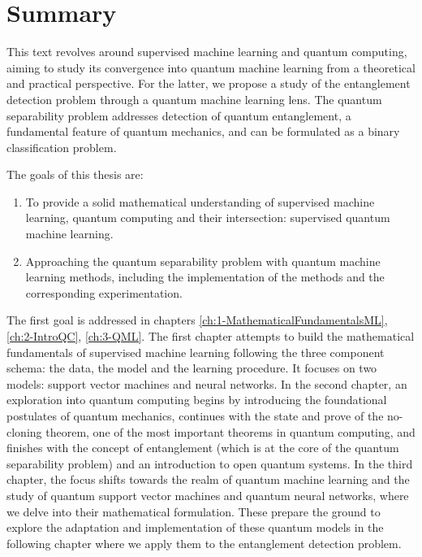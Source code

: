 %

\chapter{Summary}

This text revolves around supervised machine learning and quantum computing, aiming to study its convergence into quantum machine learning from a theoretical and practical perspective. For the latter, we propose a study of the entanglement detection problem through a quantum machine learning lens. The quantum separability problem addresses detection of quantum entanglement, a fundamental feature of quantum mechanics, and can be formulated as a binary classification problem.
\vspace{5pt}

The goals of this thesis are: 
\begin{enumerate}
	\item To provide a solid mathematical understanding of supervised machine learning, quantum computing and their intersection: supervised quantum machine learning.
	\item Approaching the quantum separability problem with quantum machine learning methods, including the implementation of the methods and the corresponding experimentation.
\end{enumerate} 

The first goal is addressed in chapters \ref{ch:1-MathematicalFundamentalsML}, \ref{ch:2-IntroQC}, \ref{ch:3-QML}. The first chapter attempts to build the mathematical fundamentals of supervised machine learning following the three component schema: the data, the model and the learning procedure. It focuses on two models: support vector machines and neural networks. 
In the second chapter, an exploration into quantum computing begins by introducing the foundational postulates of quantum mechanics, continues with the state and prove of the no-cloning theorem, one of the most important theorems in quantum computing, and finishes with the concept of entanglement (which is at the core of the quantum separability problem) and an introduction to open quantum systems.
In the third chapter, the focus shifts towards the realm of quantum machine learning and the study of quantum support vector machines and quantum neural networks, where we delve into their mathematical formulation. These prepare the ground to explore the adaptation and implementation of these quantum models in the following chapter where we apply them to the entanglement detection problem.
\vspace{5pt}

